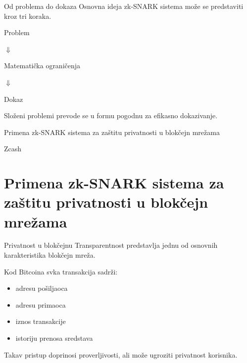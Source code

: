 \documentclass[aspectratio=1610]{beamer}
\begin{document}
\begin{frame}{Od problema do dokaza}
    Osnovna ideja zk-SNARK sistema može se predstaviti kroz tri koraka.
    
    \bigskip
    
    \begin{center}
    Problem
    
    \(\Downarrow\)
    
    Matematička ograničenja
    
    \(\Downarrow\)
    
    Dokaz
    \end{center}
    
    \bigskip
    
    Složeni problemi prevode se u formu pogodnu za efikasno dokazivanje.
    \end{frame}

\begin{frame}
\centering
\vfill

{\Huge Primena zk-SNARK sistema za zaštitu privatnosti u blokčejn mrežama}

\vspace{0.6cm}

{\Large Zcash}

\vfill
\end{frame}

\section{Primena zk-SNARK sistema za zaštitu privatnosti u blokčejn mrežama}

\begin{frame}{Privatnost u blokčejnu}
Transparentnost predstavlja jednu od osnovnih karakteristika blokčejn mreža.

\bigskip

Kod Bitcoina svka transakcija sadrži:

\begin{itemize}
    \item adresu pošiljaoca
    \item adresu primaoca
    \item iznos transakcije
    \item istoriju prenosa sredstava
\end{itemize}

\bigskip

Takav pristup doprinosi proverljivosti, ali može ugroziti privatnost korisnika.
\end{frame}
\end{document}
